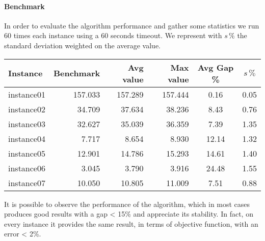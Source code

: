 \paragraph*{Benchmark}
In order to evaluate the algorithm performance and gather some statistics we run 60 times each instance using a 60 seconds timeout. We represent with $s\,\%$ the standard deviation weighted on the average value.
\begin{center}
\small
\begin{tabular}{lrrrcc}
\toprule
Instance	&	Benchmark	&	Avg value	&	Max value	&	Avg Gap \%	&	$s\,\%$	\\
\midrule
instance01	&	157.033		&	157.289		&	157.444		&	0.16		&	0.05	\\
instance02	&	34.709		&	37.634		&	38.236		&	8.43		&	0.76	\\
instance03	&	32.627		&	35.039		&	36.359		&	7.39		&	1.35	\\
instance04	&	7.717		&	8.654		&	8.930		&	12.14		&	1.32	\\
instance05	&	12.901		&	14.786		&	15.293		&	14.61		&	1.40	\\
instance06	&	3.045		&	3.790		&	3.916		&	24.48		&	1.55	\\
instance07	&	10.050		&	10.805		&	11.009		&	7.51		&	0.88	\\
\bottomrule
\end{tabular}
\end{center}
It is possible to observe the performance of the algorithm, which in most cases produces good results with a gap < 15\% and appreciate its stability. In fact, on every instance it provides the same result, in terms of objective function, with an error < 2\%.